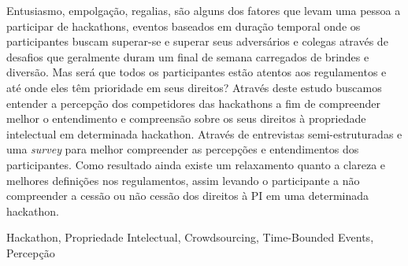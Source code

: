 Entusiasmo, empolgação, regalias, são alguns dos fatores que levam uma pessoa a participar de hackathons, eventos baseados em duração temporal onde os participantes buscam superar-se e superar seus adversários e colegas através de desafios que geralmente duram um final de semana carregados de brindes e diversão. Mas será que todos os participantes estão atentos aos regulamentos e até onde eles têm prioridade em seus direitos? Através deste estudo buscamos entender a percepção dos competidores das hackathons a fim de compreender melhor o entendimento e compreensão sobre os seus direitos à propriedade intelectual em determinada hackathon. Através de entrevistas semi-estruturadas e uma \textit{survey} para melhor compreender as percepções e entendimentos dos participantes. Como resultado ainda existe um relaxamento quanto a clareza e melhores definições nos regulamentos, assim levando o participante a não compreender a cessão ou não cessão dos direitos à PI em uma determinada hackathon.  


\begin{keywords}
Hackathon, Propriedade Intelectual, Crowdsourcing, Time-Bounded Events, Percepção
\end{keywords}